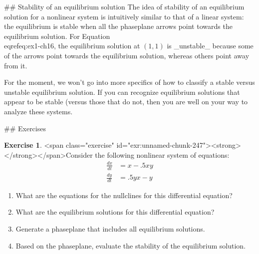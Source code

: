 \documentclass[
]{book}
\theoremstyle{definition}
\theoremstyle{definition}
\theoremstyle{definition}
\newtheorem{exercise}{Exercise}[chapter]
\theoremstyle{remark}
\begin{document}
## Stability of an equilibrium solution
The idea of stability of an equilibrium solution for a nonlinear system is intuitively similar to that of a linear system: the equilibrium is stable when all the phaseplane arrows point towards the equilibrium solution.  For Equation \\eqref{eq:ex1-ch16}, the equilibrium solution at $(1,1)$ is _unstable_ because some of the arrows point towards the equilibrium solution, whereas others point away from it.  


For the moment, we won't go into more specifics of how to classify a stable versus unstable equilibrium solution. If you can recognize equilibrium solutions that appear to be stable (versus those that do not, then you are well on your way to analyze these systems.



\newpage

## Exercises
\begin{exercise}
<span class="exercise" id="exr:unnamed-chunk-247"><strong>\label{exr:unnamed-chunk-247} </strong></span>Consider the following nonlinear system of equations:
\begin{equation}
\begin{split}
\frac{dx}{dt} &= x - .5xy  \\
\frac{dy}{dt} &= .5yx-y
\end{split}
\end{equation}

\begin{enumerate}[label=\alph*.]
\item What are the equations for the nullclines for this differential equation?
\item What are the equilibrium solutions for this differential equation?
\item Generate a phaseplane that includes all equilibrium solutions.
\item Based on the phaseplane, evaluate the stability of the equilibrium solution.
\end{enumerate}
\end{exercise}
\end{document}
